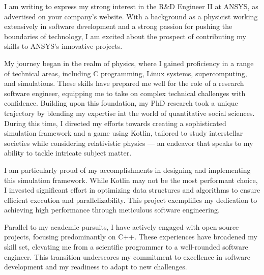 \documentclass[11pt, a4paper]{awesome-cv}
\begin{document}
\makecvheader[R]

\makecvfooter
  {}%
  {}%
  {}

\makelettertitle

\begin{cvletter}


I am writing to express my strong interest in the R\&D Engineer II at ANSYS, as advertised on your company's website. With a background as a physicist working extensively in software development and a strong passion for pushing the boundaries of technology, I am excited about the prospect of contributing my skills to ANSYS's innovative projects.

My journey began in the realm of physics, where I gained proficiency in a range of technical areas, including C programming, Linux systems, supercomputing, and simulations. These skills have prepared me well for the role of a research software engineer, equipping me to take on complex technical challenges with confidence. Building upon this foundation, my PhD research took a unique trajectory by blending my expertise int the world of quantitative social sciences. During this time, I directed my efforts towards creating a sophisticated simulation framework and a game using Kotlin, tailored to study interstellar societies while considering relativistic physics — an endeavor that speaks to my ability to tackle intricate subject matter.

I am particularly proud of my accomplishments in designing and implementing this simulation framework. While Kotlin may not be the most performant choice, I invested significant effort in optimizing data structures and algorithms to ensure efficient execution and parallelizability. This project exemplifies my dedication to achieving high performance through meticulous software engineering.

Parallel to my academic pursuits, I have actively engaged with open-source projects, focusing predominantly on C++. These experiences have broadened my skill set, elevating me from a scientific programmer to a well-rounded software engineer. This transition underscores my commitment to excellence in software development and my readiness to adapt to new challenges.


\end{cvletter}
\end{document}
